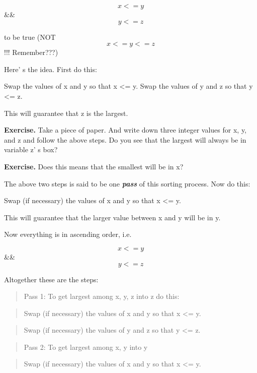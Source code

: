 \[x  <=  y\]  \&\&  \[y  <=  z\]

to be true (NOT \[x <= y <= z\] !!! Remember???)

Here' s the idea. First do this:\\
\begin{tightlist}
\li
  Swap the values of x and y so that x <= y.
\li
  Swap the values of y and z so that y <= z.
\end{tightlist}
This will guarantee that z is the largest.

\textbf{Exercise.} Take a piece of paper. And write down three integer
values for x, y, and z and follow the above steps. Do you see that the
largest will always be in variable z' s box?

\textbf{Exercise.} Does this means that the smallest will be in x?

The above two steps is said to be one \textit{\textbf{pass}} of this
sorting process. Now do this:
\begin{tightlist}
\li
  Swap (if necessary) the values of x and y so that x <= y.
\end{tightlist}

This will guarantee that the larger value between x and y will be in y.

Now everything is in ascending order, i.e.

\[x  <=  y\]  \&\&  \[y  <=  z\]

Altogether these are the steps:

\begin{quote}
Pass 1: To get largest among x, y, z into z do this:
\end{quote}
\begin{tightlist}
\li
  \begin{quote}
  Swap (if necessary) the values of x and y so that x <= y.
  \end{quote}
\li
  \begin{quote}
  Swap (if necessary) the values of y and z so that y <= z.
  \end{quote}
\end{tightlist}
\begin{quote}
Pass 2: To get largest among x, y into y
\end{quote}
\begin{tightlist}
\li
  \begin{quote}
  Swap (if necessary) the values of x and y so that x <= y.
  \end{quote}
\end{tightlist}

